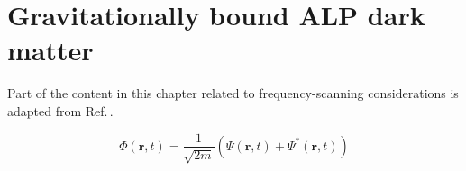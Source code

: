 \chapter{Gravitationally bound ALP dark matter}\label{chap:gravALP}
\begin{jointwork}
    Part of the content in this chapter related to frequency-scanning considerations is adapted from Ref.\,\cite{Gao2025_EarthDM}.
\end{jointwork}



\begin{equation}
    \Phi \left(\mathbf{r},t\right)=\frac{1}{\sqrt{2m}}(\Psi\left(\mathbf{r},t\right)+\Psi^\ast\left(\mathbf{r},t\right))
\end{equation}
